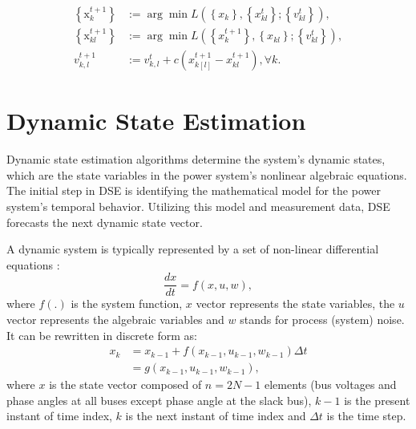 \begin{equation}
    \begin{aligned}
\left\{\mathrm{x}_{k}^{t+1}\right\} & :=\arg \min L\left(\left\{x_{k}\right\},\left\{x_{k l}^{t}\right\} ;\left\{v_{k l}^{t}\right\}\right), \\
\left\{\mathrm{x}_{k l}^{t+1}\right\} & :=\arg \min L\left(\left\{x_{k}^{t+1}\right\},\left\{x_{k l}\right\} ;\left\{v_{k l}^{t}\right\}\right),\\
v_{k, l}^{t+1} & :=v_{k, l}^{t}+c\left(x_{k[l]}^{t+1}-x_{k l}^{t+1}\right), \forall k.
\end{aligned}
\end{equation}

\section{Dynamic State Estimation}\label{sec:ch1/sec5}

Dynamic state estimation algorithms determine the system's dynamic states, which are the state variables in the power system's nonlinear algebraic equations. The initial step in DSE is identifying the mathematical model for the power system's temporal behavior. Utilizing this model and measurement data, DSE forecasts the next dynamic state vector.

A dynamic system is typically represented by a set of non-linear differential equations \autocite{4510059, 5871327}:
\begin{equation}
    \frac{d x}{d t}=f(x, u, w),
    \label{eq:dynamic_eq}
\end{equation}
where $f(.)$ is the system function, $x$ vector represents the state variables, the $u$ vector represents the algebraic variables and $w$ stands for process (system) noise. It can be rewritten in discrete form as:
\begin{equation}
    \begin{aligned}
x_{k} & =x_{k-1}+f\left(x_{k-1}, u_{k-1}, w_{k-1}\right) \Delta t \\
& =g\left(x_{k-1}, u_{k-1}, w_{k-1}\right),
\end{aligned}
\end{equation}
where $x$ is the state vector composed of $n = 2N-1$ elements (bus voltages and  phase angles at all buses except phase angle at the slack bus), $k-1$ is the present instant of time index, $k$ is the next instant of time index  and $\Delta t$ is the time step.

